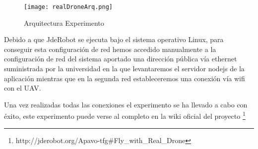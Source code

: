 \begin{figure}[H]
        \centering
        \texttt{[image: realDroneArq.png]}
        \caption{Arquitectura Experimento}
    \end{figure}

Debido a que JdeRobot se ejecuta bajo el sistema operativo Linux, para conseguir esta configuración de red hemos accedido manualmente a la configuración de red del sistema aportado una dirección pública vía ethernet suministrada por la universidad en la que levantaremos el servidor nodejs de la aplicación mientras que en la segunda red estableceremos una conexión vía wifi con el UAV. 

Una vez realizadas todas las conexiones el experimento se ha llevado a cabo con éxito, este experimento puede verse al completo en la wiki oficial del proyecto \footnote{http://jderobot.org/Apavo-tfg#Fly_with_Real_Drone}


